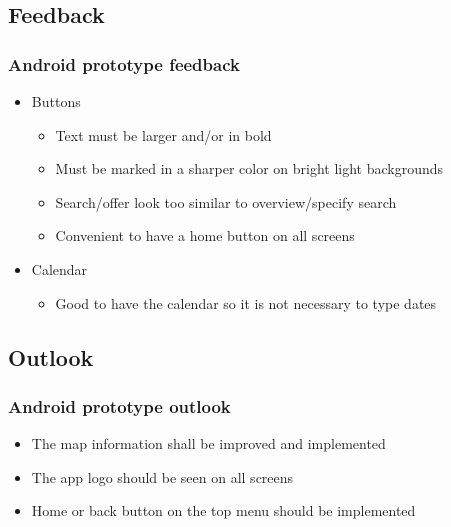 \documentclass{beamer}
\begin{document}

\subsection{Feedback} %


\begin{frame}
\frametitle{Android prototype feedback}
\begin{itemize}
\item Buttons
\begin{itemize}
\item Text must be larger and/or in bold
\item Must be marked in a sharper color on bright light backgrounds
\item Search/offer look too similar to overview/specify search
\item Convenient to have a home button on all screens
\end{itemize}
\item Calendar
\begin{itemize}
\item Good to have the calendar so it is not necessary to type dates
\end{itemize}
\end{itemize}
\end{frame}


\subsection{Outlook} %


\begin{frame}
\frametitle{Android prototype outlook}
\begin{itemize}
\item The map information shall be improved and implemented
\item The app logo should be seen on all screens
\item Home or back button on the top menu should be implemented
\end{itemize}
\end{frame}
\end{document}

